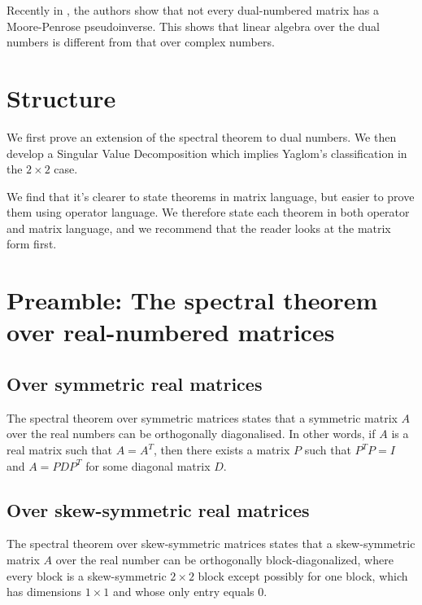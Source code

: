 \documentclass[
]{article}
\theoremstyle{theorem}
\theoremstyle{proposition}
\begin{document}
Recently in \cite{pinv}, the authors show that not every dual-numbered matrix has a Moore-Penrose pseudoinverse. This shows that linear algebra over the dual numbers is different from that over complex numbers.

\hypertarget{structure}{%
\section{Structure}\label{structure}}

We first prove an extension of the spectral theorem to dual numbers. We then develop a Singular Value Decomposition which implies Yaglom's classification in the $2 \times 2$ case.

We find that it's clearer to state theorems in matrix language, but easier to prove them using operator language. We therefore state each theorem in both operator and matrix language, and we recommend that the reader looks at the matrix form first.

\hypertarget{preamble-the-spectral-theorem-over-real-numbered-matrices}{%
\section{Preamble: The spectral theorem over real-numbered matrices}\label{preamble-the-spectral-theorem-over-real-numbered-matrices}}

\hypertarget{over-symmetric-real-matrices}{%
\subsection{Over symmetric real matrices}\label{over-symmetric-real-matrices}}

The spectral theorem over symmetric matrices states that a symmetric matrix \(A\) over the real numbers can be orthogonally diagonalised. In other words, if \(A\) is a real matrix such that \(A = A^T\), then there exists a matrix \(P\) such that \(P^TP=I\) and \(A = PDP^T\) for some diagonal matrix \(D\).

\hypertarget{over-skew-symmetric-real-matrices}{%
\subsection{Over skew-symmetric real matrices}\label{over-skew-symmetric-real-matrices}}

The spectral theorem over skew-symmetric matrices states that a skew-symmetric matrix \(A\) over the real number can be orthogonally block-diagonalized, where every block is a skew-symmetric $2 \times 2$ block except possibly for one block, which has dimensions $1\times 1$ and whose only entry equals \(0\).
\end{document}
